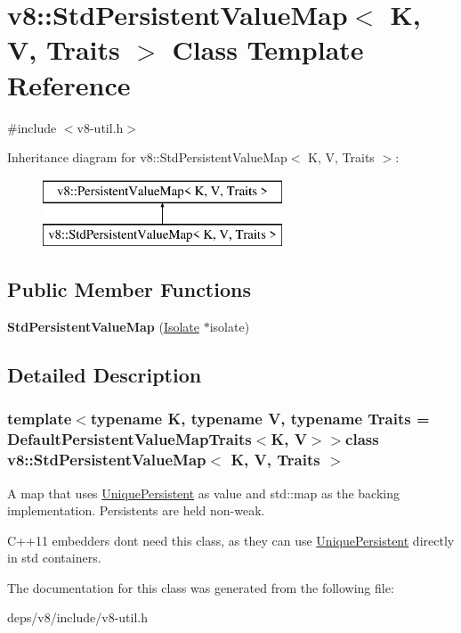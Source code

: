 \hypertarget{classv8_1_1_std_persistent_value_map}{}\section{v8\+:\+:Std\+Persistent\+Value\+Map$<$ K, V, Traits $>$ Class Template Reference}
\label{classv8_1_1_std_persistent_value_map}


{\ttfamily \#include $<$v8-\/util.\+h$>$}

Inheritance diagram for v8\+:\+:Std\+Persistent\+Value\+Map$<$ K, V, Traits $>$\+:\begin{figure}[H]
\begin{center}
\leavevmode
\includegraphics[height=2.000000cm]{classv8_1_1_std_persistent_value_map}
\end{center}
\end{figure}
\subsection*{Public Member Functions}
\begin{DoxyCompactItemize}
\item 
\hypertarget{classv8_1_1_std_persistent_value_map_a44d7222a863267780db07c882056f73b}{}{\bfseries Std\+Persistent\+Value\+Map} (\hyperlink{classv8_1_1_isolate}{Isolate} $\ast$isolate)\label{classv8_1_1_std_persistent_value_map_a44d7222a863267780db07c882056f73b}

\end{DoxyCompactItemize}


\subsection{Detailed Description}
\subsubsection*{template$<$typename K, typename V, typename Traits = Default\+Persistent\+Value\+Map\+Traits$<$\+K, V$>$$>$class v8\+::\+Std\+Persistent\+Value\+Map$<$ K, V, Traits $>$}

A map that uses \hyperlink{classv8_1_1_unique_persistent}{Unique\+Persistent} as value and std\+::map as the backing implementation. Persistents are held non-\/weak.

C++11 embedders don\textquotesingle{}t need this class, as they can use \hyperlink{classv8_1_1_unique_persistent}{Unique\+Persistent} directly in std containers. 

The documentation for this class was generated from the following file\+:\begin{DoxyCompactItemize}
\item 
deps/v8/include/v8-\/util.\+h\end{DoxyCompactItemize}
